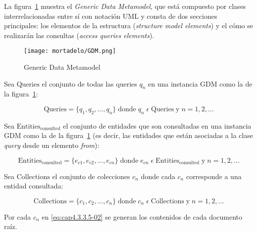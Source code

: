La figura~\ref{img:mortadelo-gdm1} muestra el \textit{Generic Data Metamodel}, que está compuesto por clases interrelacionadas entre sí con notación UML y consta de dos secciones principales: los elementos de la estructura (\textit{structure model elements}) y el cómo se realizarán las consultas (\textit{access queries elements}).


\begin{figure}[H] 
    \centering
    \texttt{[image: mortadelo/GDM.png]}
    \caption{Generic Data Metamodel}
    \label{img:mortadelo-gdm1}
\end{figure}



Sea $\mathrm{Queries}$ el conjunto de todas las queries $q_{n}$ en una instancia GDM como la de la figura~\ref{img:mortadelo-gdm1}:

\begin{equation} \label{eq:cap4.3.3.5-00}
    \mathrm{Queries} = \{q_{1}, q_{2},..., q_{n}\}\; \mathrm{donde}\; q_{n}\;\epsilon\;\mathrm{Queries}\; \mathrm{y}\; n=1,2,...
\end{equation}


Sea $\mathrm{Entities_{consulted}}$ el conjunto de entidades que son consultadas en una instancia GDM como la de la figura~\ref{img:mortadelo-gdm1} (es decir, las entidades que están asociadas a la clase \textit{query} desde un elemento \textit{from}): 


\begin{equation} \label{eq:cap4.3.3.5-01}
    \mathrm{Entities_{consulted}} = \{e_{c1},e_{c2},...,e_{cn}\}\; \mathrm{donde}\; e_{cn}\;\epsilon\;\mathrm{Entities_{consulted}}\; \mathrm{y}\; n=1,2,...
\end{equation}

Sea $\mathrm{Collections}$ el conjunto de colecciones $c_{n}$ donde cada $c_{n}$ corresponde a una entidad consultada:

\begin{equation} \label{eq:cap4.3.3.5-02}
    \mathrm{Collections} = \{c_{1},c_{2},...,c_{n}\}\; \mathrm{donde}\; c_{n}\;\epsilon\;\mathrm{Collections}\; \mathrm{y}\; n=1,2,...
\end{equation}




Por cada $c_{n}$ en \eqref{eq:cap4.3.3.5-02} se generan los contenidos de cada documento raíz.



